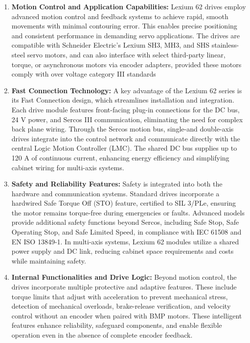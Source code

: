 \begin{enumerate}
	\item \textbf{Motion Control and Application Capabilities:} Lexium 62 drives employ advanced motion control and feedback systems to achieve rapid, smooth movements with minimal contouring error. This enables precise positioning and consistent performance in demanding servo applications. The drives are compatible with Schneider Electric’s Lexium SH3, MH3, and SHS stainless-steel servo motors, and can also interface with select third-party linear, torque, or asynchronous motors via encoder adapters, provided these motors comply with over voltage category III standards
	
	\item \textbf{Fast Connection Technology:} A key advantage of the Lexium 62 series is its Fast Connection design, which streamlines installation and integration. Each drive module features front-facing plug-in connections for the DC bus, 24 V power, and Sercos III communication, eliminating the need for complex back plane wiring. Through the Sercos motion bus, single-and double-axis drives integrate into the control network and communicate directly with the central Logic Motion Controller (LMC). The shared DC bus supplies up to 120 A of continuous current, enhancing energy efficiency and simplifying cabinet wiring for multi-axis systems.
	
	\item \textbf{Safety and Reliability Features:} Safety is integrated into both the hardware and communication systems. Standard drives incorporate a hardwired Safe Torque Off (STO) feature, certified to SIL 3/PLe, ensuring the motor remains torque-free during emergencies or faults. Advanced models provide additional safety functions beyond Sercos, including Safe Stop, Safe Operating Stop, and Safe Limited Speed, in compliance with IEC 61508 and EN ISO 13849-1. In multi-axis systems, Lexium 62 modules utilize a shared power supply and DC link, reducing cabinet space requirements and costs while maintaining safety.
	
	\item \textbf{Internal Functionalities and Drive Logic:} Beyond motion control, the drives incorporate multiple protective and adaptive features. These include torque limits that adjust with acceleration to prevent mechanical stress, detection of mechanical overloads, brake-release verification, and velocity control without an encoder when paired with \acs{BMP} motors. These intelligent features enhance reliability, safeguard components, and enable flexible operation even in the absence of complete encoder feedback.
\end{enumerate}

